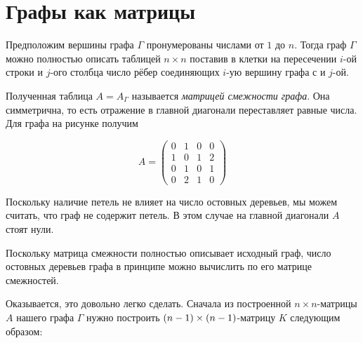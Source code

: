 \documentclass{article}
\begin{document}
\section{Графы как матрицы}

{

\begin{wrapfigure}{r}{32 mm}
\end{wrapfigure}

Предположим вершины графа $\Gamma$ пронумерованы числами от $1$ до $n$.
Тогда граф $\Gamma$ можно полностью описать таблицей $n\times n$ поставив в клетки на пересечении $i$-ой строки и $j$-ого столбца число рёбер соединяющих $i$-ую вершину графа с и $j$-ой.

}

Полученная таблица $A=A_\Gamma$ называется \emph{матрицей смежности графа}.
Она симметрична, то есть отражение в главной диагонали переставляет равные числа.
Для графа на рисунке получим 

\[A=\left(
\begin{matrix}
0&1&0&0
\\
1&0&1&2
\\
0&1&0&1
\\
0&2&1&0
\end{matrix}
\right)\]

Поскольку наличие петель не влияет на число остовных деревьев, мы можем считать, что граф не содержит петель.
В этом случае на главной диагонали $A$ стоят нули.

Поскольку матрица смежности полностью описывает исходный граф, 
число остовных деревьев графа в принципе можно вычислить по его матрице смежностей.

Оказывается, это довольно легко сделать.
Сначала из построенной $n\times n$-матрицы  $A$ нашего графа $\Gamma$ нужно построить $(n-1)\z\times(n-1)$-матрицу $K$ следующим образом: 
\end{document}
